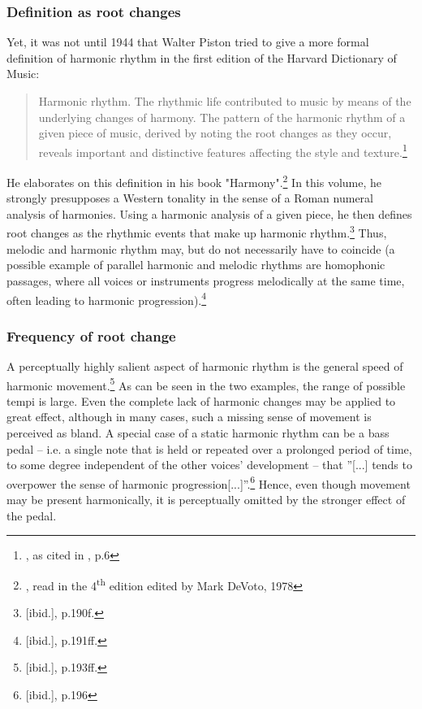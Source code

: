 \documentclass[a4paper,12pt]{report}
\begin{document}
\subsubsection{Definition as root changes}
Yet, it was not until 1944 that Walter Piston tried to give a more formal definition of harmonic rhythm in the first edition of the Harvard Dictionary of Music:
\begin{quote}
Harmonic rhythm. The rhythmic life contributed to music by means of the underlying changes of harmony. The pattern of the harmonic rhythm of a given piece of music, derived by noting the root changes as they occur, reveals important and distinctive features affecting the style and texture.\footnote{\cite{willi1944harvard}, as cited in \cite{swain2002harmonic}, p.6}
\end{quote}
He elaborates on this definition in his book "Harmony".\footnote{\cite{piston1978harmony}, read in the 4\textsuperscript{th} edition edited by Mark DeVoto, 1978} In this volume, he strongly presupposes a Western tonality in the sense of a Roman numeral analysis of harmonies. Using a harmonic analysis of a given piece, he then defines root changes as the rhythmic events that make up harmonic rhythm.\footnote{[ibid.], p.190f.} Thus, melodic and harmonic rhythm may, but do not necessarily have to coincide (a possible example of parallel harmonic and melodic rhythms are homophonic passages, where all voices or instruments progress melodically at the same time, often leading to harmonic progression).\footnote{[ibid.], p.191ff.}

\subsubsection{Frequency of root change}
A perceptually highly salient aspect of harmonic rhythm is the general speed of harmonic movement.\footnote{[ibid.], p.193ff.} As can be seen in the two examples, the range of possible tempi is large. Even the complete lack of harmonic changes may be applied to great effect, although in many cases, such a missing sense of movement is perceived as bland. A special case of a static harmonic rhythm can be a bass pedal -- i.e. a single note that is held or repeated over a prolonged period of time, to some degree independent of the other voices' development -- that ''[...] tends to overpower the sense of harmonic progression[...]''.\footnote{[ibid.], p.196} Hence, even though movement may be present harmonically, it is perceptually omitted by the stronger effect of the pedal.
\end{document}
